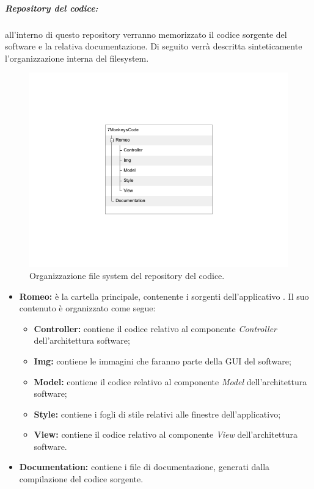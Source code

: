 \subparagraph{Repository del codice:}
\label{repocodice}
all'interno di questo repository\g{} verranno memorizzato il codice sorgente del software e la relativa documentazione. Di seguito verrà descritta sinteticamente l'organizzazione interna del filesystem.

\begin{figure}[h!]
\centering
\includegraphics[scale=0.5]{./content/Immagini/filesystemcode}
\caption{Organizzazione file system del repository del codice.}
\label{filesystemcodice}
\end{figure}

\begin{itemize}
\item \textbf{Romeo:} è la cartella principale, contenente i sorgenti dell'applicativo \project{}. Il suo contenuto è organizzato come segue:
\begin{itemize}
\item \textbf{Controller:} contiene il codice relativo al componente \textit{Controller} dell'architettura software;
\item \textbf{Img:} contiene le immagini che faranno parte della GUI\g{} del software;
\item \textbf{Model:} contiene il codice relativo al componente \textit{Model} dell'architettura software;
\item \textbf{Style:} contiene i fogli di stile relativi alle finestre dell'applicativo;
\item \textbf{View:} contiene il codice relativo al componente \textit{View} dell'architettura software.
\end{itemize}
\item \textbf{Documentation:} contiene i file di documentazione, generati dalla compilazione del codice sorgente.
\end{itemize}

